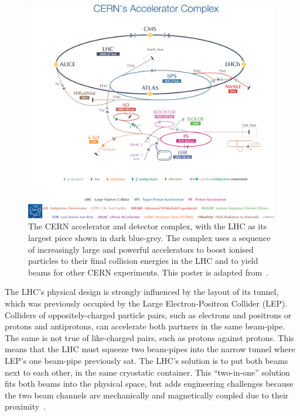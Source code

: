 \begin{figure}[tp]
\centering
\includegraphics[width=0.99\textwidth]{figures/atlas_lhc_complex.png}
\caption[
The CERN accelerator and detector complex, with the LHC as its largest piece
]{%
The CERN accelerator and detector complex, with the LHC as its largest piece
shown in dark blue-grey.
The complex uses a sequence of increasingly large and powerful accelerators to
boost ionised particles to their final collision energies in the LHC and to
yield beams for other CERN experiments.
This poster is adapted from~\cite{Haffner:1621894}.
}
\label{fig:experiment_cern_complex}
\end{figure}

The LHC's physical design is strongly influenced by the layout of its tunnel,
which was previously occupied by the Large Electron-Positron Collider (LEP).
Colliders of oppositely-charged particle pairs, such as electrons and positrons
or protons and antiprotons, can accelerate both partners in the same beam-pipe.
The same is not true of like-charged pairs, such as protons against protons.
This means that the LHC must squeeze two beam-pipes into the narrow tunnel
where LEP's one beam-pipe previously sat.
The LHC's solution is to put both beams next to each other, in
the same cryostatic container.
This ``two-in-one'' solution fits both beams into the physical space, but adds
engineering challenges because the two beam channels are mechanically and
magnetically coupled due to their
proximity~\cite{lhcDesignreport2004,lhc2008machine}.

